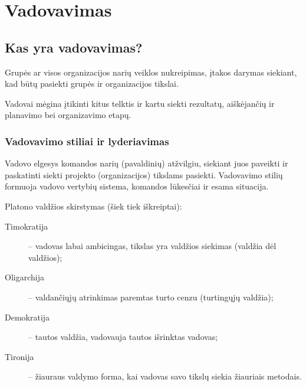 \chapter{Vadovavimas}

\section{Kas yra vadovavimas?}

\begin{defn}[Vadovavimas]
  Grupės ar visos organizacijos narių veiklos nukreipimas, įtakos
  darymas siekiant, kad būtų pasiekti grupės ir organizacijos tikslai.
\end{defn}

Vadovai mėgina įtikinti kitus telktis ir kartu siekti rezultatų,
aiškėjančių ir planavimo bei organizavimo etapų.

\subsection{Vadovavimo stiliai ir lyderiavimas}

\begin{defn}
  Vadovo elgesys komandos narių (pavaldinių) atžvilgiu, siekiant juos
  paveikti ir paskatinti siekti projekto (organizacijos) tikslams
  pasiekti. Vadovavimo stilių formuoja vadovo vertybių sistema,
  komandos lūkesčiai ir esama situacija.
\end{defn}

Platono valdžios skirstymas (šiek tiek iškreiptai):
\begin{description}
  \item[Timokratija] – vadovas labai ambicingas, tikslas yra valdžios
    siekimas (valdžia dėl valdžios);
  \item[Oligarchija] – valdančiųjų atrinkimas paremtas turto cenzu
    (turtingųjų valdžia);
  \item[Demokratija] – tautos valdžia, vadovauja tautos išrinktas vadovas;
  \item[Tironija] – žiauraus valdymo forma, kai vadovas savo tikslų
    siekia žiauriais metodais.
\end{description}

